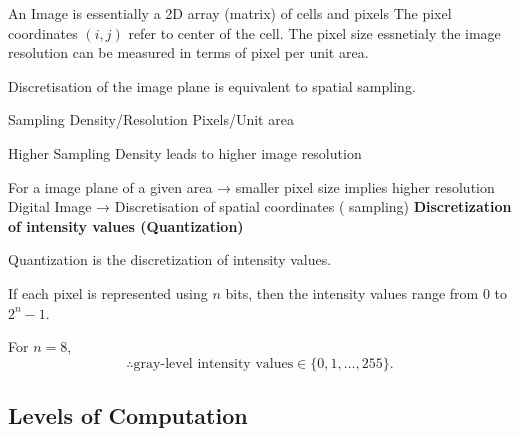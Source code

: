 \documentclass[11pt]{article}
\theoremstyle{definition}
\begin{document}
An Image is essentially a 2D array (matrix) of cells and pixels
The pixel coordinates \((i, j)\) refer to center of the cell.
The pixel size essnetialy the image resolution can be measured in terms of pixel per unit area.

Discretisation of the image plane is equivalent to spatial sampling. 

Sampling Density/Resolution Pixels/Unit area

Higher Sampling Density leads to higher image resolution

For a image plane of a given area → smaller pixel size implies higher resolution 
Digital Image → Discretisation of spatial coordinates ( sampling)
\newpage
\textbf{Discretization of intensity values (Quantization)}

Quantization is the discretization of intensity values.

If each pixel is represented using $n$ bits, then the intensity values range from
$0$ to $2^{n} - 1$.
\begin{shaded}
For $n = 8$,
\[
\therefore \text{gray-level intensity values} \in \{0, 1, \ldots, 255\}.
\]
\end{shaded}


\subsection{Levels of Computation}
\end{document}
